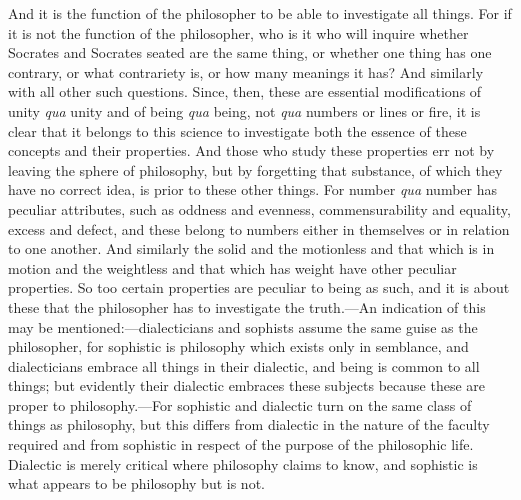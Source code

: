 And it is the function of the philosopher to be able to investigate all things. For if it is not the function of the philosopher, who is it who will inquire whether Socrates and Socrates seated are the same thing, or whether one thing has one contrary, or what contrariety is, or how many meanings it has? And similarly with all other such questions. Since, then, these are essential modifications of unity \emph{qua} unity and of being \emph{qua} being, not \emph{qua} numbers or lines or fire, it is clear that it belongs to this science to investigate both the essence of these concepts and their properties. And those who study these properties err not by leaving the sphere of philosophy, but by forgetting that substance, of which they have no correct idea, is prior to these other things. For number \emph{qua} number has peculiar attributes, such as oddness and evenness, commensurability and equality, excess and defect, and these belong to numbers either in themselves or in relation to one another. And similarly the solid and the motionless and that which is in motion and the weightless and that which has weight have other peculiar properties. So too certain properties are peculiar to being as such, and it is about these that the philosopher has to investigate the truth.—An indication of this may be mentioned:—dialecticians and sophists assume the same guise as the philosopher, for sophistic is philosophy which exists only in semblance, and dialecticians embrace all things in their dialectic, and being is common to all things; but evidently their dialectic embraces these subjects because these are proper to philosophy.—For sophistic and dialectic turn on the same class of things as philosophy, but this differs from dialectic in the nature of the faculty required and from sophistic in respect of the purpose of the philosophic life. Dialectic is merely critical where philosophy claims to know, and sophistic is what appears to be philosophy but is not.

